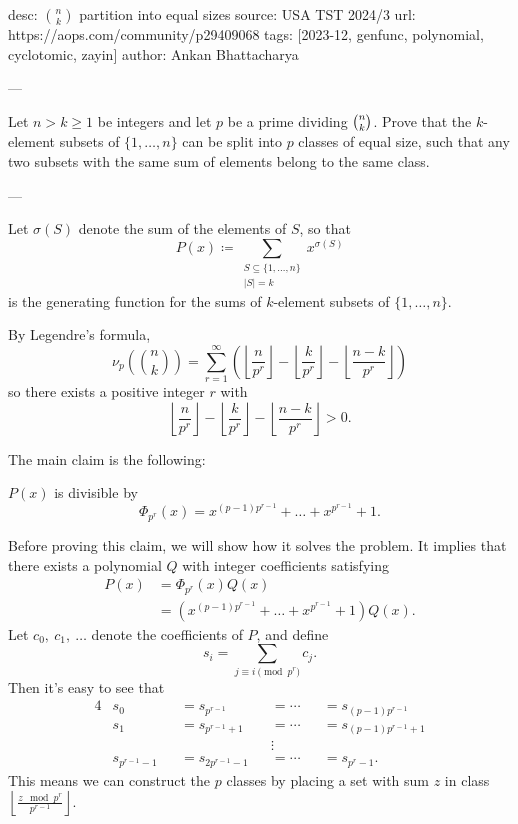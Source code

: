 desc: $\binom{n}{k}$ partition into equal sizes
source: USA TST 2024/3
url: https://aops.com/community/p29409068
tags: [2023-12, genfunc, polynomial, cyclotomic, zayin]
author: Ankan Bhattacharya

---

Let $n > k \ge 1$ be integers and let $p$ be a prime dividing $\tbinom nk$.
Prove that the $k$-element subsets of $\{1, \dots, n\}$ can be
split into $p$ classes of equal size, such that
any two subsets with the same sum of elements belong to the same class.

---

Let $\sigma(S)$ denote the sum of the elements of $S$, so that
\[ P(x) \coloneqq \sum_{\substack{S\subseteq \{1, \dots, n\} \\ |S|=k}} x^{\sigma(S)} \]
is the generating function for the sums of $k$-element subsets of $\{1, \dots, n\}$.

By Legendre's formula,
\[ \nu_p\left(\binom{n}{k}\right) = \sum_{r=1}^{\infty}
  \left(\left\lfloor\frac{n}{p^r}\right\rfloor - \left\lfloor\frac{k}{p^r}\right\rfloor
  - \left\lfloor\frac{n-k}{p^r}\right\rfloor\right) \]
so there exists a positive integer $r$ with
\[ \left\lfloor\frac{n}{p^r}\right\rfloor - \left\lfloor\frac{k}{p^r}\right\rfloor
- \left\lfloor\frac{n-k}{p^r}\right\rfloor > 0. \]

The main claim is the following:
\begin{claim*}
  $P(x)$ is divisible by
  \[
    \Phi_{p^r}(x) = x^{(p-1)p^{r-1}} + \dots + x^{p^{r-1}} + 1.
  \]
\end{claim*}

Before proving this claim, we will show how it solves the problem. It implies
that there exists a polynomial $Q$ with integer coefficients satisfying
\begin{align*}
	P(x) & = \Phi_{p^r}(x) Q(x)\\
	& = (x^{(p-1)p^{r-1}} + \dots + x^{p^{r-1}} + 1) Q(x).
\end{align*}
Let $c_0,\ c_1,\ \dots$ denote the coefficients of $P$, and define
\[ s_i = \sum_{j \equiv i \pmod{p^r}} c_j. \]
Then it's easy to see that
\begin{alignat*}{4}
	& s_0 && = s_{p^{r-1}} && = \cdots && = s_{(p-1)p^{r-1}}\\
	& s_1 && = s_{p^{r-1}+1} && = \cdots && = s_{(p-1)p^{r-1}+1}\\
	&  &&  && \vdots &&\\
	& s_{p^{r-1}-1} && = s_{2p^{r-1}-1} && = \cdots && = s_{p^r-1}.
\end{alignat*}
This means we can construct the $p$ classes by placing a set with sum $z$ in
class $\left\lfloor\frac{z\mod{p^r}}{p^{r-1}}\right\rfloor$.

